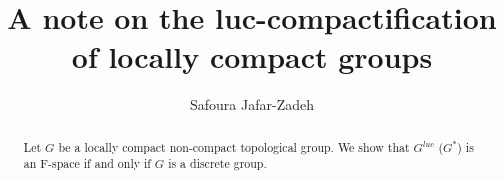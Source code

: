 \documentclass[12pt,a4paper]{amsart}
\theoremstyle{plain}
\theoremstyle{definition}
\begin{document}
\title{A note on the luc-compactification of locally compact groups}




\author[S. Jafar-Zadeh]{Safoura Jafar-Zadeh}

\address{Department of Mathematics,
342 Machray Hall, 186 Dysart Road,
University of Manitoba, Winnipeg, MB R3T 2N2, Canada.
} 




\begin{abstract}
 Let $G$ be a locally compact non-compact topological group. We show that $G^{luc}$ ($G^*$) is an F-space if and only if $G$ is a discrete group.
\end{abstract}

\maketitle
\end{document}

